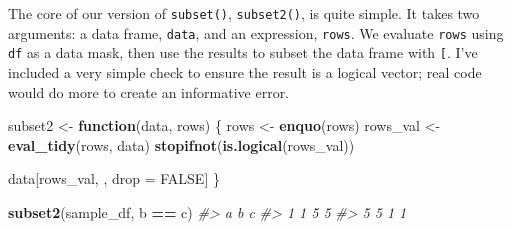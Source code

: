 \documentclass[]{book}
\newenvironment{Shaded}{\begin{snugshade}}{\end{snugshade}}
\newcommand{\CommentTok}[1]{\textcolor[rgb]{0.37,0.37,0.37}{\textit{#1}}}
\newcommand{\ControlFlowTok}[1]{\textcolor[rgb]{0.27,0.27,0.27}{\textbf{#1}}}
\newcommand{\DataTypeTok}[1]{\textcolor[rgb]{0.27,0.27,0.27}{#1}}
\newcommand{\DecValTok}[1]{\textcolor[rgb]{0.06,0.06,0.06}{#1}}
\newcommand{\KeywordTok}[1]{\textcolor[rgb]{0.27,0.27,0.27}{\textbf{#1}}}
\newcommand{\NormalTok}[1]{#1}
\newcommand{\OperatorTok}[1]{\textcolor[rgb]{0.43,0.43,0.43}{\textbf{#1}}}
\newcommand{\OtherTok}[1]{\textcolor[rgb]{0.37,0.37,0.37}{#1}}
\newcommand{\StringTok}[1]{\textcolor[rgb]{0.5,0.5,0.5}{#1}}
\begin{document}
\begin{Shaded}
\end{Shaded}

The core of our version of \texttt{subset()}, \texttt{subset2()}, is quite simple. It takes two arguments: a data frame, \texttt{data}, and an expression, \texttt{rows}. We evaluate \texttt{rows} using \texttt{df} as a data mask, then use the results to subset the data frame with \texttt{{[}}. I've included a very simple check to ensure the result is a logical vector; real code would do more to create an informative error.

\begin{Shaded}
\begin{Highlighting}[]
\NormalTok{subset2 <-}\StringTok{ }\ControlFlowTok{function}\NormalTok{(data, rows) \{}
\NormalTok{  rows <-}\StringTok{ }\KeywordTok{enquo}\NormalTok{(rows)}
\NormalTok{  rows_val <-}\StringTok{ }\KeywordTok{eval_tidy}\NormalTok{(rows, data)}
  \KeywordTok{stopifnot}\NormalTok{(}\KeywordTok{is.logical}\NormalTok{(rows_val))}

\NormalTok{  data[rows_val, , drop =}\StringTok{ }\OtherTok{FALSE}\NormalTok{]}
\NormalTok{\}}

\KeywordTok{subset2}\NormalTok{(sample_df, b }\OperatorTok{==}\StringTok{ }\NormalTok{c)}
\CommentTok{#>   a b c}
\CommentTok{#> 1 1 5 5}
\CommentTok{#> 5 5 1 1}
\end{Highlighting}
\end{Shaded}
\end{document}
